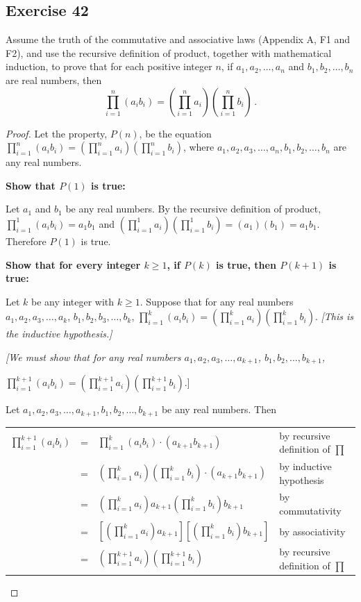 \documentclass[14pt]{extarticle}
\newcommand{\dps}{\displaystyle}
\newcommand{\cy}{\color{cyan}}
\begin{document}
\subsection{Exercise 42}
Assume the truth of the commutative and associative laws (Appendix A, F1 and F2), and use the recursive definition 
of product, together with mathematical induction, to prove that for each positive integer $n$, if $a_1, a_2, \ldots, 
a_n$ and $b_1, b_2, \ldots, b_n$ are real numbers, then
\[
\prod_{i = 1}^{n}(a_i b_i) = \left(\prod_{i = 1}^{n} a_i \right) \left(\prod_{i = 1}^{n} b_i \right) \,.
\]
\begin{proof}
Let the property, $P(n)$, be the equation \(\prod_{i = 1}^{n}(a_i b_i) = \left(\prod_{i = 1}^{n} a_i \right) \left 
(\prod_{i = 1}^{n} b_i \right)\), where \(a_1, a_2, a_3, \ldots, a_n, b_1, b_2, \ldots, b_n\) are any real numbers.

{\bf Show that $P(1)$ is true:}

Let $a_1$ and $b_1$ be any real numbers. By the recursive
definition of product, \(\dps \prod_{i=1}^1 (a_i b_i) = a_1 
b_1\) and \(\dps \left(\prod_{i = 1}^{1} a_i \right) \left 
(\prod_{i = 1}^{1} b_i \right) = (a_1)(b_1) = a_1 b_1\). 
Therefore $P(1)$ is true.

{\bf Show that for every integer \(k \geq 1\), if $P(k)$ is true, then \(P(k + 1)\) is true:}

Let $k$ be any integer with \(k \geq 1\). Suppose that for any real numbers \(a_1, a_2, a_3, \ldots, a_k\), \(b_1, 
b_2, b_3, \ldots, b_k\), \(\prod_{i = 1}^{k}(a_i b_i) = \left (\prod_{i = 1}^{k} a_i \right) \left (\prod_{i = 1}
^{k} b_i \right)\). {\it [This is the inductive hypothesis.]}

{\it [We must show that for any real numbers \(a_1, a_2, a_3, \ldots, a_{k+1}\), \(b_1, b_2, \ldots, b_{k+1}\), 

\(\prod_{i = 1}^{k+1}(a_i b_i) = \left(\prod_{i = 1}^{k+1} a_i \right) \left (\prod_{i = 1}^{k+1} b_i \right)\).]}

Let \(a_1, a_2, a_3, \ldots, a_{k+1}, b_1, b_2, \ldots, b_{k+1}\) be any real numbers. Then

\begin{center}
\begin{tabular}{rcll}
\(\dps \prod_{i = 1}^{k+1}(a_i b_i)\) & = & \(\dps \prod_{i = 1}^{k}(a_i b_i) \cdot (a_{k+1}b_{k+1})\) & 
{\cy by recursive definition of $\prod$} \\
& = & \(\dps \left( \prod_{i = 1}^{k}a_i \right) \left( \prod_{i = 1}^{k}b_i \right) \cdot (a_{k+1}b_{k+1})\) & 
{\cy by inductive hypothesis} \\
& = & \(\dps \left( \prod_{i = 1}^{k}a_i \right) a_{k+1} \left( \prod_{i = 1}^{k}b_i \right) b_{k+1}\) & 
{\cy by commutativity} \\
& = & \(\dps \left[\left( \prod_{i = 1}^{k}a_i \right)a_{k+1}\right] \left[\left( \prod_{i = 1}^{k}b_i \right) b_{k+1}\right]\) & 
{\cy by associativity} \\
& = & \(\dps \left(\prod_{i = 1}^{k+1} a_i \right) \left (\prod_{i = 1}^{k+1} b_i \right)\) & 
{\cy by recursive definition of $\prod$}
\end{tabular}
\end{center}
\end{proof}
\end{document}
